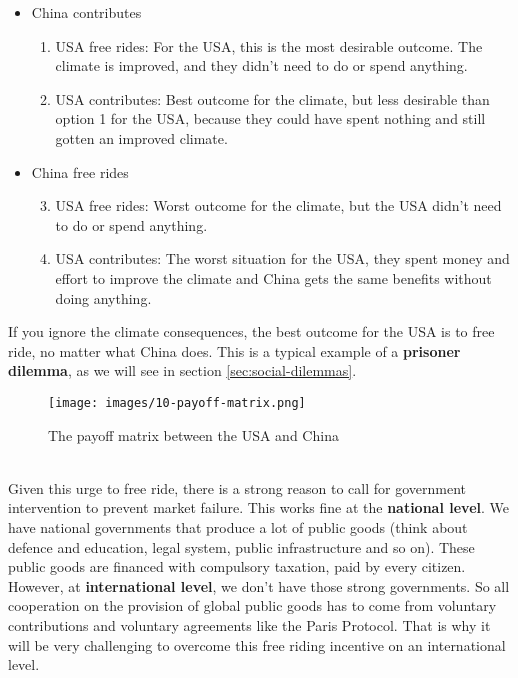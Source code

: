 \documentclass[../summary.tex]{subfiles}
\begin{document}
	\begin{itemize}
		\item China contributes
		\begin{enumerate}
			\item USA free rides: For the USA, this is the most desirable outcome. The climate is improved, and they didn't need to do or spend anything.
			\item USA contributes: Best outcome for the climate, but less desirable than option 1 for the USA, because they could have spent nothing and still gotten an improved climate.
		\end{enumerate}
		\item China free rides
		\begin{enumerate}
			\setcounter{enumi}{2}
			\item USA free rides: Worst outcome for the climate, but the USA didn't need to do or spend anything.
			\item USA contributes: The worst situation for the USA, they spent money and effort to improve the climate and China gets the same benefits without doing anything.
		\end{enumerate}
	\end{itemize}
	If you ignore the climate consequences, the best outcome for the USA is to free ride, no matter what China does. This is a typical example of a \textbf{prisoner dilemma}, as we will see in section \ref{sec:social-dilemmas}.
	
	\begin{figure}[htbp]
		\centering
		\texttt{[image: images/10-payoff-matrix.png]}
		\caption{The payoff matrix between the USA and China}
		\label{fig:payoff-matrix}
	\end{figure}
	
	\ \\
	Given this urge to free ride, there is a strong reason to call for government intervention to prevent market failure. This works fine at the \textbf{national level}. We have national governments that produce a lot of public goods (think about defence and education, legal system, public infrastructure and so on). These public goods are financed with compulsory taxation, paid by every citizen. However, at \textbf{international level}, we don't have those strong governments. So all cooperation on the provision of global public goods has to come from voluntary contributions and voluntary agreements like the Paris Protocol. That is why it will be very challenging to overcome this free riding incentive on an international level.
	
\end{document}
